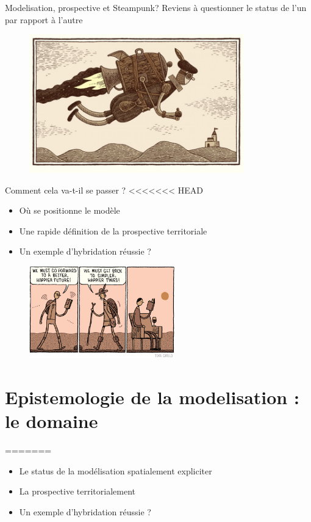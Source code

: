 \documentclass[newPxFont]{beamer}
\begin{document}
\begin{frame}[c]{Modelisation, prospective et Steampunk?}
  \vspace{-1cm}
  Reviens à questionner le status de l'un par rapport à l'autre
  \begin{figure}
    \includegraphics[height=6cm]{img/a_Tom-Gauld-jetpack.jpg}
  \end{figure}
\end{frame}

\begin{frame}[c]{Comment cela va-t-il se passer ?}
<<<<<<< HEAD
  \vspace{-1cm}
  \begin{itemize}
    \item Où se positionne le modèle
    \item Une rapide définition de la prospective territoriale
    \item Un exemple d'hybridation réussie ?
  \end{itemize}

  \begin{figure}
    \includegraphics[height=4cm]{./img/a_Tom-Gauld-walk.jpg}
  \end{figure}
\end{frame}

\section{Epistemologie de la modelisation : le domaine}
=======
\vspace{-1cm}
\begin{itemize}
  \item Le status de la modélisation spatialement expliciter
  \item La prospective territorialement
  \item Un exemple d'hybridation réussie ?
\end{itemize}
\end{document}
